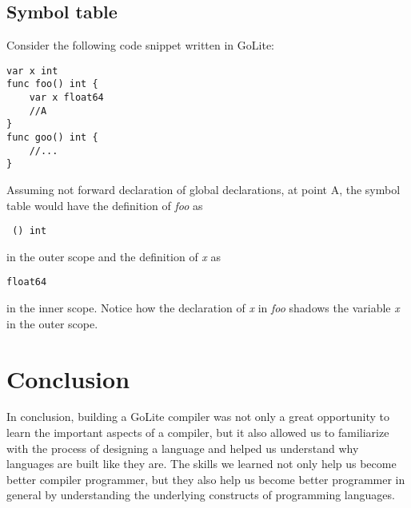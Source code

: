 \documentclass[a4paper]{article}
\begin{document}
\subsection{Symbol table} \label{symtab}
Consider the following code snippet written in GoLite:
\begin{verbatim}
var x int
func foo() int {
    var x float64 
    //A
}
func goo() int {
    //...
}
\end{verbatim}
Assuming not forward declaration of global declarations, at point A, the symbol table would have the definition of \textit{foo} as 
\begin{verbatim} () int \end{verbatim}
in the outer scope and the definition of \textit{x} as 
\begin{verbatim}float64\end{verbatim}
in the inner scope. Notice how the declaration of \textit{x} in \textit{foo} shadows the variable \textit{x} in the outer scope.

\section{Conclusion}
In conclusion, building a GoLite compiler was not only a great opportunity to learn the important aspects of a compiler, but it also allowed us to familiarize with the process of designing a language and helped us understand why languages are built like they are. The skills we learned not only help us become better compiler programmer, but they also help us become better programmer in general by understanding the underlying constructs of programming languages.
\end{document}
